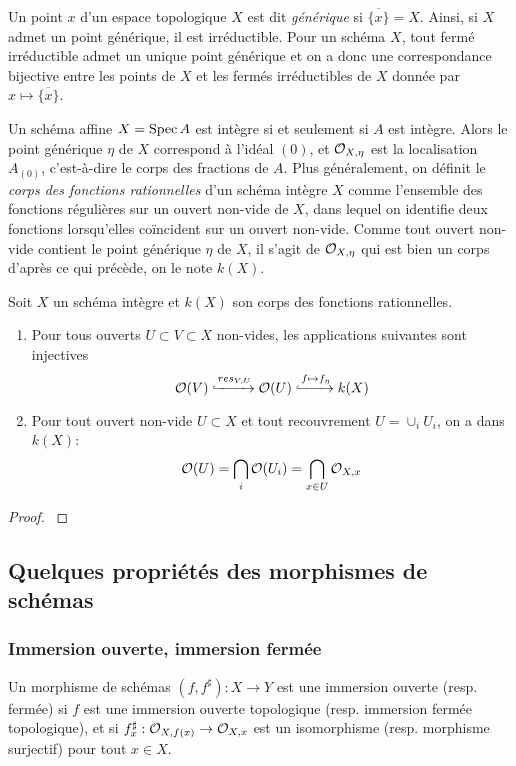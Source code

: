 Un point $x$ d'un espace topologique $X$ est dit \textit{générique} si $\overline{\lbrace x\rbrace}=X$. Ainsi, si $X$ admet un point générique, il est irréductible. Pour un schéma $X$, tout fermé irréductible admet un unique point générique et on a donc une correspondance bijective entre les points de $X$ et les fermés irréductibles de $X$ donnée par $x\mapsto \overline{\lbrace x\rbrace}$. 

Un schéma affine $X=\operatorname{Spec} A$ est intègre si et seulement si $A$ est intègre. Alors le point générique $\eta$ de $X$ correspond à l'idéal $(0)$, et $\mathcal{O}_{X,\eta}$ est la localisation $A_{(0)}$, c'est-à-dire le corps des fractions de $A$. Plus généralement, on définit le \textit{corps des fonctions rationnelles} d'un schéma intègre $X$ comme l'ensemble des fonctions régulières sur un ouvert non-vide de $X$, dans lequel on identifie deux fonctions lorsqu'elles coïncident sur un ouvert non-vide. Comme tout ouvert non-vide contient le point générique $\eta$ de $X$, il s'agit de $\mathcal{O}_{X,\eta}$ qui est bien un corps d'après ce qui précède, on le note $k(X)$.

\begin{prop}
Soit $X$ un schéma intègre et $k(X)$ son corps des fonctions rationnelles. 
\begin{enumerate}
\item Pour tous ouverts $U\subset V\subset X$ non-vides, les applications suivantes sont injectives
$$\mathcal{O}(V)\xhookrightarrow{res_{V,U}}\mathcal{O}(U)\xhookrightarrow{f\mapsto f_\eta} k(X)$$
\item Pour tout ouvert non-vide $U\subset X$ et tout recouvrement $U=\cup_i U_i$, on a dans $k(X)$:
$$\mathcal{O}(U)=\bigcap_i \mathcal{O}(U_i)=\bigcap_{x\in U}\mathcal{O}_{X,x}$$
\end{enumerate}
\end{prop}
\begin{proof}
\cite[3.29]{Gortz}
\end{proof}

\subsection{Quelques propriétés des morphismes de schémas}

\subsubsection{Immersion ouverte, immersion fermée}

\begin{defn}
Un morphisme de schémas $(f,f^\sharp):X\rightarrow Y$ est une immersion ouverte (resp. fermée) si $f$ est une immersion ouverte topologique (resp. immersion fermée topologique), et si $f^\sharp_x:\mathcal{O}_{X,f(x)}\rightarrow \mathcal{O}_{X,x}$ est un isomorphisme (resp. morphisme surjectif) pour tout $x\in X$.
\end{defn}

